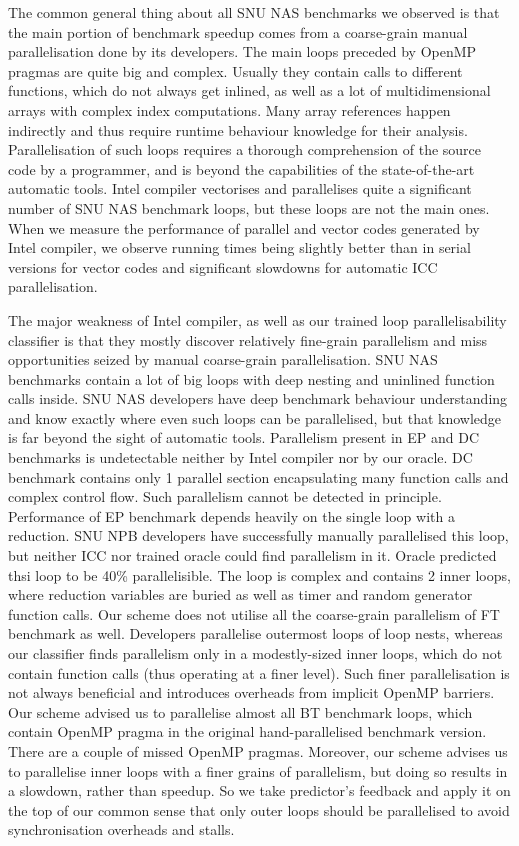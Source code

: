 \documentclass[sigconf,10pt,review,anonymous]{acmart}
\begin{document}
\quad The common general thing about all SNU NAS benchmarks we observed is that the main portion of benchmark speedup comes from a coarse-grain manual parallelisation done by its developers. The main loops preceded by OpenMP pragmas are quite big and complex. Usually they contain calls to different functions, which do not always get inlined, as well as a lot of multidimensional arrays with complex index computations. Many array references happen indirectly and thus require runtime behaviour knowledge for their analysis. Parallelisation of such loops requires a thorough comprehension of the source code by a programmer, and is beyond the capabilities of the state-of-the-art automatic tools.\newline
\quad Intel compiler vectorises and parallelises quite a significant number of SNU NAS benchmark loops, but these loops are not the main ones. When we measure the performance of parallel and vector codes generated by Intel compiler, we observe running times being slightly better than in serial versions for vector codes and significant slowdowns for automatic ICC parallelisation.       


\quad The major weakness of Intel compiler, as well as our trained loop parallelisability classifier is that they mostly discover relatively fine-grain parallelism and miss opportunities seized by manual coarse-grain parallelisation. SNU NAS benchmarks contain a lot of big loops with deep nesting and uninlined function calls inside. SNU NAS developers have deep benchmark behaviour understanding and know exactly where even such loops can be parallelised, but that knowledge is far beyond the sight of automatic tools. 
\quad Parallelism present in EP and DC benchmarks is undetectable neither by Intel compiler nor by our oracle. DC benchmark contains only 1 parallel section encapsulating many function calls and complex control flow. Such parallelism cannot be detected in principle. Performance of EP benchmark depends heavily on the single loop with a reduction. SNU NPB developers have successfully manually parallelised this loop, but neither ICC nor trained oracle could find parallelism in it. Oracle predicted thsi loop to be 40\% parallelisible. The loop is complex and contains 2 inner loops, where reduction variables are buried as well as timer and random generator function calls.\newline
\quad Our scheme does not utilise all the coarse-grain parallelism of FT benchmark as well. Developers parallelise outermost loops of loop nests, whereas our classifier finds parallelism only in a modestly-sized inner loops, which do not contain function calls (thus operating at a finer level). Such finer parallelisation is not always beneficial and introduces overheads from implicit OpenMP barriers.
\quad Our scheme advised us to parallelise almost all BT benchmark loops, which contain OpenMP pragma in the original hand-parallelised benchmark version. There are a couple of missed OpenMP pragmas. Moreover, our scheme advises us to parallelise inner loops with a finer grains of parallelism, but doing so results in a slowdown, rather than speedup. So we take predictor's feedback and apply it on the top of our common sense that only outer loops should be parallelised to avoid synchronisation overheads and stalls.    
\end{document}
